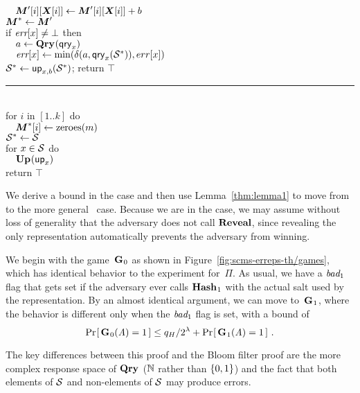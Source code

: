 \begin{figure*}[t]
{      $\tab \v.M'[i][\v.X[i]] \gets \v.M'[i][\v.X[i]] + b$\\
    $\v.M^* \gets \v.M'$\\
    if $\textit{err}[x] \neq \bot$ then\\
      $\hspace*{10pt} a \gets \textup{\textbf{Qry}}\hspace{0.5pt}(\mathsf{qry}_x)$\\
      $\hspace*{10pt}\textit{err}[x] \gets \min(\delta(a,\mathsf{qry}_x(\mathcal{S}^*)),err[x])$\\
    $\mathcal{S}^* \gets \mathsf{up}_{x,b}(\mathcal{S}^*)$;
    return $\top$
  \vspace{6pt}\hrule\vspace{3pt}
  \oraclev{$\REPO(\col)$}\hfill{}\\[2pt]
    for $i$ in $[1..k]$ do\\
      $\tab \v.M^*[i] \gets \zeroes(m)$\\
    $\mathcal{S}^* \gets \mathcal{S}$\\
    for $x \in \mathcal{S}$ do\\
    $\hspace*{10pt}\textup{\textbf{Up}}\hspace{0.5pt}(\mathsf{up}_x)$\\
    return $\top$
}
\caption{Games 0--3 for proof of Theorem~\ref{thm:scms-erreps-th}.}
\label{fig:scms-erreps-th/games}
\end{figure*}

We derive a bound in the  case and then use Lemma~\ref{thm:lemma1} to
move from  to the more general \erreps\ case. Because we are in the
 case, we may assume without loss of generality that the adversary does
not call $\mathbf{Reveal}$, since revealing the only representation automatically prevents
the adversary from winning.

We begin with the game~$\textup{\textbf{G}}\hspace{0.5pt}_0$ as shown in Figure~\ref{fig:scms-erreps-th/games}, which has identical behavior to the 
experiment for~$\Pi$. As usual, we have a
$\textit{bad}_1$ flag that gets set if the adversary ever calls $\textup{\textbf{Hash}}\hspace{0.5pt}_1$ with the
actual salt used by the representation. By an almost identical argument, we can
move to~$\textup{\textbf{G}}\hspace{0.5pt}_1$, where the behavior is different only when the $\textit{bad}_1$ flag
is set, with a bound of
\begin{equation}
  \Pr\hspace{-1pt}\left[\,\textup{\textbf{G}}\hspace{0.5pt}_0(\mathit{A})=1\,\right] \leq
    q_H/2^\lambda + \Pr\hspace{-1pt}\left[\,\textup{\textbf{G}}\hspace{0.5pt}_1(\mathit{A})=1\,\right] \,.
\end{equation}

The key differences between this proof and the Bloom filter proof are the more
complex response space of $\textup{\textbf{Qry}}\hspace{0.5pt}$ ($\mathbb{N}$ rather than $\{0,1\}$) and the fact that
both elements of $\mathcal{S}$ and non-elements of $\mathcal{S}$ may produce errors.

